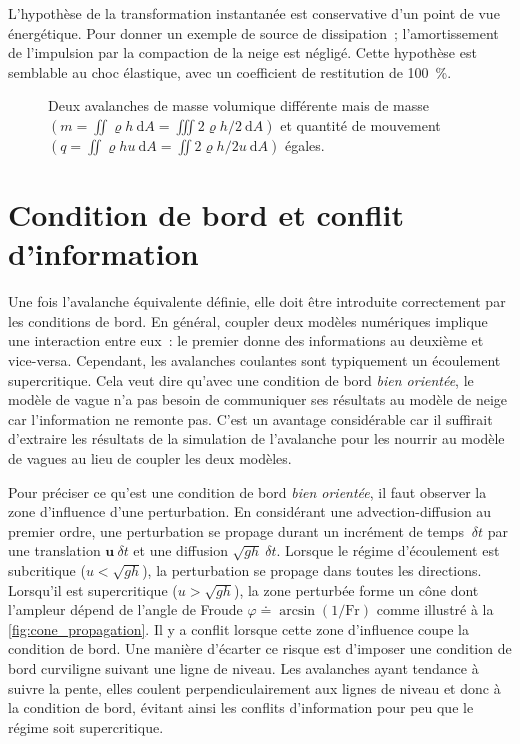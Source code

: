 L'hypothèse de la transformation instantanée est conservative d'un point de vue énergétique. Pour donner un exemple de source de dissipation~; l'amortissement de l'impulsion par la compaction de la neige est négligé. Cette hypothèse est semblable au choc élastique, avec un coefficient de restitution de \SI{100}{\percent}.

\begin{figure}
    \centering
    
    \caption{Deux avalanches de masse volumique différente mais de masse $\left(m=\iint\varrho h~\mathrm dA=\iiint2\varrho h/2~\mathrm dA\right)$ et quantité de mouvement $\left(q=\iint\varrho hu~\mathrm dA=\iint2\varrho h/2 u~\mathrm dA\right)$ égales.}
    \label{fig:avalanches_equivalentes}
\end{figure}


\section{Condition de bord et conflit d'information}

Une fois l'avalanche équivalente définie, elle doit être introduite correctement par les conditions de bord. En général, coupler deux modèles numériques implique une interaction entre eux~: le premier donne des informations au deuxième et vice-versa. Cependant, les avalanches coulantes sont typiquement un écoulement supercritique. Cela veut dire qu'avec une condition de bord \emph{bien orientée}, le modèle de vague n'a pas besoin de communiquer ses résultats au modèle de neige car l'information ne remonte pas. C'est un avantage considérable car il suffirait d'extraire les résultats de la simulation de l'avalanche pour les nourrir au modèle de vagues au lieu de coupler les deux modèles.

Pour préciser ce qu'est une condition de bord \emph{bien orientée}, il faut observer la zone d'influence d'une perturbation. En considérant une advection-diffusion au premier ordre, une perturbation se propage durant un incrément de temps $~\delta t$ par une translation $\bm u ~\delta t$ et une diffusion $\sqrt{gh} ~\delta t$. Lorsque le régime d'écoulement est subcritique ($u<\sqrt{gh}$), la perturbation se propage dans toutes les directions. Lorsqu'il est supercritique ($u>\sqrt{gh}$), la zone perturbée forme un cône dont l'ampleur dépend de l'angle de Froude $\varphi\doteq\arcsin(1/\mathrm{Fr})$ comme illustré à la \autoref{fig:cone_propagation}. Il y a conflit lorsque cette zone d'influence coupe la condition de bord. Une manière d'écarter ce risque est d'imposer une condition de bord curviligne suivant une ligne de niveau. Les avalanches ayant tendance à suivre la pente, elles coulent perpendiculairement aux lignes de niveau et donc à la condition de bord, évitant ainsi les conflits d'information pour peu que le régime soit supercritique.

